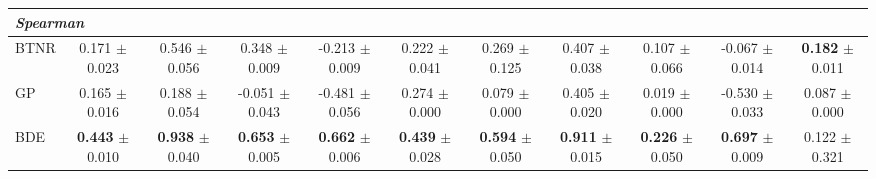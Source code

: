 \begin{table}[t]
{\begin{tabular}{lcccccccccc}
\midrule\midrule
\multicolumn{11}{l}{\textit{Spearman}} \\
\midrule
\shortstack[l]{BTNR \\ {}} & \shortstack{0.171 \\ $\pm$ 0.023} & \shortstack{0.546 \\ $\pm$ 0.056} & \shortstack{0.348 \\ $\pm$ 0.009} & \shortstack{-0.213 \\ $\pm$ 0.009} & \shortstack{0.222 \\ $\pm$ 0.041} & \shortstack{0.269 \\ $\pm$ 0.125} & \shortstack{0.407 \\ $\pm$ 0.038} & \shortstack{0.107 \\ $\pm$ 0.066} & \shortstack{-0.067 \\ $\pm$ 0.014} & \shortstack{\textbf{0.182} \\ $\pm$ 0.011} \\
\midrule\midrule
\shortstack[l]{GP \\ {}} & \shortstack{0.165 \\ $\pm$ 0.016} & \shortstack{0.188 \\ $\pm$ 0.054} & \shortstack{-0.051 \\ $\pm$ 0.043} & \shortstack{-0.481 \\ $\pm$ 0.056} & \shortstack{0.274 \\ $\pm$ 0.000} & \shortstack{0.079 \\ $\pm$ 0.000} & \shortstack{0.405 \\ $\pm$ 0.020} & \shortstack{0.019 \\ $\pm$ 0.000} & \shortstack{-0.530 \\ $\pm$ 0.033} & \shortstack{0.087 \\ $\pm$ 0.000} \\
\midrule
\shortstack[l]{BDE \\ {}} & \shortstack{\textbf{0.443} \\ $\pm$ 0.010} & \shortstack{\textbf{0.938} \\ $\pm$ 0.040} & \shortstack{\textbf{0.653} \\ $\pm$ 0.005} & \shortstack{\textbf{0.662} \\ $\pm$ 0.006} & \shortstack{\textbf{0.439} \\ $\pm$ 0.028} & \shortstack{\textbf{0.594} \\ $\pm$ 0.050} & \shortstack{\textbf{0.911} \\ $\pm$ 0.015} & \shortstack{\textbf{0.226} \\ $\pm$ 0.050} & \shortstack{\textbf{0.697} \\ $\pm$ 0.009} & \shortstack{0.122 \\ $\pm$ 0.321} \\

\end{tabular}}
\end{table}
